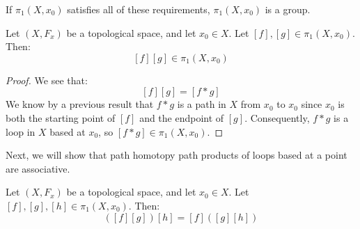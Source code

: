 If $\pi_1(X,x_0)$ satisfies all of these requirements, $\pi_1(X,x_0)$ is a group. 
\begin{lemma}
	[Closure] Let $(X,F_x)$ be a topological space, and let $x_0\in X$. Let $[f],[g]\in \pi_1(X,x_0)$. Then:
	\[[f][g] \in \pi_1(X,x_0)\]
\end{lemma}
\begin{proof}
	We see that:
	\[[f][g] = [f*g]\]
	We know by a previous result that $f*g$ is a path in $X$ from $x_0$ to $x_0$ since $x_0$ is both the starting point of $[f]$ and the endpoint of $[g]$. Consequently, $f*g$ is a loop in $X$ based at $x_0$, so $[f*g] \in \pi_1(X,x_0)$. 
\end{proof}

Next, we will show that path homotopy path products of loops based at a point are associative. 
\begin{lemma}
	[Associativity] Let $(X,F_x)$ be a topological space, and let $x_0\in X$. Let $[f],[g],[h]\in \pi_1(X,x_0)$. Then:
	\[ ([f][g])[h] = [f]([g][h])\]
\end{lemma}
